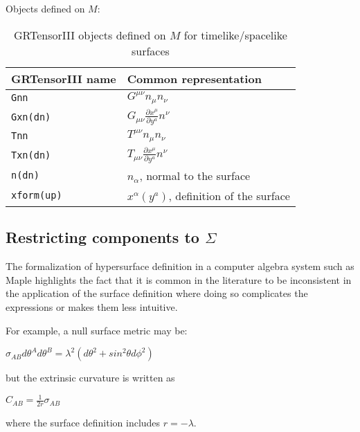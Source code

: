 \documentclass{article}
\begin{document}
Objects defined on $M$:
\begin{table}
  \begin{center}
    \begin{tabular}{ll}\hline\hline
      \textbf{GRTensorIII name} & \textbf{Common representation}\\ \hline
      \texttt{Gnn}        & $G^{\mu \nu} n_\mu n_\nu $  \\
      \texttt{Gxn(dn)}        & $G_{\mu \nu} \frac{\partial x^\mu}{\partial y^a} n^\nu $  \\
      \texttt{Tnn}        & $T^{\mu \nu} n_\mu n_\nu $  \\
      \texttt{Txn(dn)}        & $T_{\mu \nu} \frac{\partial x^\mu}{\partial y^a} n^\nu $  \\
      \texttt{n(dn) }      & $n_\alpha$, normal to the surface   \\    
      \texttt{xform(up)}        & $x^\alpha(y^a)$, definition of the surface  \\    
    \end{tabular}
    \caption{GRTensorIII objects defined on $M$ for timelike/spacelike surfaces}
    \label{tab:ts2}
  \end{center}
\end{table}

\subsection{Restricting components to $\Sigma$}
The formalization of hypersurface definition in a computer algebra system such as Maple highlights the
fact that it is common in the literature to be inconsistent in the application of the surface definition where
doing so complicates the expressions or makes them less intuitive. 

For example, a null surface metric may be:
\begin{center}
$\sigma_{AB} d\theta^A d\theta^B = \lambda^2 \left(d\theta^2 + sin^2 \theta d\phi^2 \right)$
\end{center}
but the extrinsic curvature is written as 
\begin{center}
$C_{AB} = \frac{1}{2r} \sigma_{AB}$
\end{center}
where the surface definition includes $r=-\lambda$.
\end{document}
